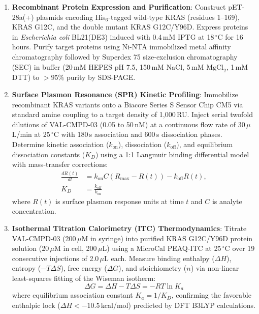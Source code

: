 \begin{enumerate}
    \item \textbf{Recombinant Protein Expression and Purification}:
    Construct pET-28a(+) plasmids encoding His$_6$-tagged wild-type KRAS (residues 1--169), KRAS G12C, and the double mutant KRAS G12C/Y96D. Express proteins in \textit{Escherichia coli} BL21(DE3) induced with 0.4\,mM IPTG at 18\,$^\circ$C for 16\,hours. Purify target proteins using Ni-NTA immobilized metal affinity chromatography followed by Superdex 75 size-exclusion chromatography (SEC) in buffer (20\,mM HEPES pH 7.5, 150\,mM NaCl, 5\,mM $\text{MgCl}_2$, 1\,mM DTT) to $>95\%$ purity by SDS-PAGE.
    
    \item \textbf{Surface Plasmon Resonance (SPR) Kinetic Profiling}:
    Immobilize recombinant KRAS variants onto a Biacore Series S Sensor Chip CM5 via standard amine coupling to a target density of 1,000\,RU. Inject serial twofold dilutions of VAL-CMPD-03 (0.05 to 50\,nM) at a continuous flow rate of 30\,$\mu$L/min at 25\,$^\circ$C with 180\,s association and 600\,s dissociation phases. Determine kinetic association ($k_{\text{on}}$), dissociation ($k_{\text{off}}$), and equilibrium dissociation constants ($K_D$) using a 1:1 Langmuir binding differential model with mass-transfer corrections:
    \begin{equation}
    \begin{split}
    \frac{dR(t)}{dt} &= k_{\text{on}} C (R_{\max} - R(t)) - k_{\text{off}} R(t), \\
    K_D &= \frac{k_{\text{off}}}{k_{\text{on}}}
    \end{split}
    \label{eq:spr_kinetics}
    \end{equation}
    where $R(t)$ is surface plasmon response units at time $t$ and $C$ is analyte concentration.
    
    \item \textbf{Isothermal Titration Calorimetry (ITC) Thermodynamics}:
    Titrate VAL-CMPD-03 (200\,$\mu$M in syringe) into purified KRAS G12C/Y96D protein solution (20\,$\mu$M in cell, 200\,$\mu$L) using a MicroCal PEAQ-ITC at 25\,$^\circ$C over 19 consecutive injections of 2.0\,$\mu$L each. Measure binding enthalpy ($\Delta H$), entropy ($-T\Delta S$), free energy ($\Delta G$), and stoichiometry ($n$) via non-linear least-squares fitting of the Wiseman isotherm:
    \begin{equation}
    \Delta G = \Delta H - T\Delta S = -RT \ln K_a
    \label{eq:itc_thermo}
    \end{equation}
    where equilibrium association constant $K_a = 1/K_D$, confirming the favorable enthalpic lock ($\Delta H < -10.5$\,kcal/mol) predicted by DFT B3LYP calculations.
    

\end{enumerate}
